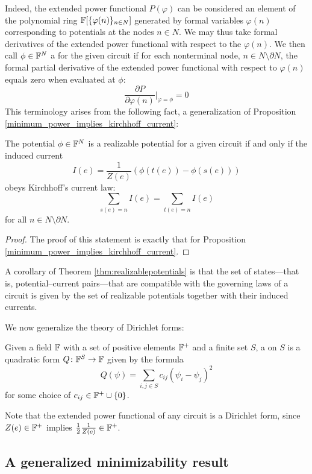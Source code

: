 Indeed, the extended power functional $P(\varphi)$ can be considered an element
of the polynomial ring ${\mathbb F}[\{\varphi(n)\}_{n \in N}]$ generated by formal
variables $\varphi(n)$ corresponding to potentials at the nodes $n \in N$. We
may thus take formal derivatives of the extended power functional with respect
to the $\varphi(n)$.  We then call $\phi \in {\mathbb F}^N$ a  for the given circuit if for each nonterminal node, $n \in N\setminus
\partial N$, the formal partial derivative of the extended power functional with
respect to $\varphi(n)$ equals zero when evaluated at $\phi$:
\[
  \frac{\partial P}{\partial \varphi(n)}\bigg\vert_{\varphi = \phi} = 0
\]
This terminology arises from the following fact, a generalization of Proposition
\ref{minimum_power_implies_kirchhoff_current}:

\begin{theorem} \label{thm:realizablepotentials}
The potential $\phi \in {\mathbb F}^N$ is a realizable potential for a given
circuit if and only if the induced current 
\[  I(e) = \frac1{Z(e)}(\phi(t(e))-\phi(s(e))) \]
obeys Kirchhoff's current law:
\[ 
\sum_{s(e) = n} I(e) = \sum_{t(e) = n} I(e)
\]  
for all $n \in N\setminus \partial N$.
\end{theorem}
\begin{proof}
The proof of this statement is exactly that for Proposition
\ref{minimum_power_implies_kirchhoff_current}. 
\end{proof}

A corollary of Theorem \ref{thm:realizablepotentials} is that the set of
states---that is, potential--current pairs---that are compatible with the
governing laws of a circuit is given by the set of realizable potentials
together with their induced currents. 

We now generalize the theory of Dirichlet forms:

\begin{definition} Given a field ${\mathbb F}$ with a set of positive elements ${\mathbb F}^+$ and
  a finite set $S$, a  on $S$ is a quadratic form   
  $Q{\colon} {\mathbb F}^S \to {\mathbb F}$ given by the formula 
  \[ Q(\psi) = \sum_{i,j \in S} c_{ij} 
  (\psi_i - \psi_j)^2 \] for some choice of $c_{i j} \in {\mathbb F}^+ \cup \{0\}$.  
\end{definition}

Note that the extended power functional of any circuit is a Dirichlet form,
since $Z(e) \in {\mathbb F}^+$ implies $\frac{1}{2}\frac{1}{Z(e)} \in {\mathbb F}^+$.

\subsection{A generalized minimizability result}

